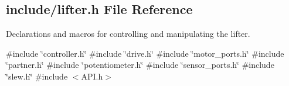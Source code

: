 \subsection{include/lifter.h File Reference}
\label{lifter_8h}


Declarations and macros for controlling and manipulating the lifter.  


{\ttfamily \#include \char`\"{}controller.\+h\char`\"{}}\newline
{\ttfamily \#include \char`\"{}drive.\+h\char`\"{}}\newline
{\ttfamily \#include \char`\"{}motor\+\_\+ports.\+h\char`\"{}}\newline
{\ttfamily \#include \char`\"{}partner.\+h\char`\"{}}\newline
{\ttfamily \#include \char`\"{}potentiometer.\+h\char`\"{}}\newline
{\ttfamily \#include \char`\"{}sensor\+\_\+ports.\+h\char`\"{}}\newline
{\ttfamily \#include \char`\"{}slew.\+h\char`\"{}}\newline
{\ttfamily \#include $<$A\+P\+I.\+h$>$}\newline
